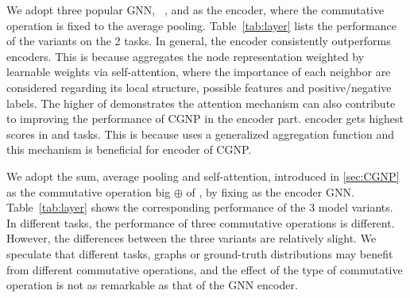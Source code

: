  We adopt three popular GNN, \GCN~\cite{GCN},
\GAT \cite{GAT} and \SAGE \cite{SAGE} as the encoder,
where the commutative operation is fixed to the average
pooling. Table~\ref{tab:layer} lists the performance of the \CGNPGNN
variants on the 2 tasks.
%
In general, the \GAT encoder consistently outperforms \GCN
encoders. This is because \GAT aggregates the node representation
weighted by learnable weights via self-attention, where the importance
of each neighbor are considered regarding its local structure,
possible features and positive/negative labels. The higher \Fone of
\GAT demonstrates the attention mechanism can also contribute to
improving the performance of CGNP in the encoder part. \SAGE encoder
gets highest \Fone scores in \SGDC and \SGSC tasks. This is because
\SAGE uses a generalized aggregation function and this mechanism is
beneficial for encoder of CGNP.

 We adopt the sum, average pooling and
self-attention, introduced in \cref{sec:CGNP} as the commutative
operation big $\oplus$ of \CGNPGNN, by fixing \GAT as the encoder GNN.
%
Table~\ref{tab:layer} shows the corresponding performance of the 3
model variants. In different tasks, the performance of three
commutative operations is different.  However, the differences between
the three variants are relatively slight.  We speculate that different
tasks, graphs or ground-truth distributions may benefit from different
commutative operations, and the effect of the type of commutative
operation is not as remarkable as that of the GNN encoder.

